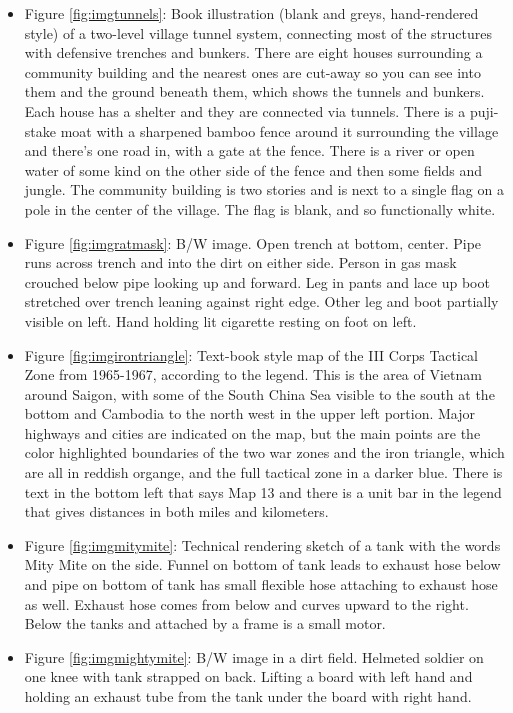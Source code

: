 \documentclass[
  11pt,
]{krantz}
\begin{document}
\begin{itemize}
\item
  Figure \ref{fig:imgtunnels}: Book illustration (blank and greys, hand-rendered style) of a two-level village tunnel system, connecting most of the structures with defensive trenches and bunkers. There are eight houses surrounding a community building and the nearest ones are cut-away so you can see into them and the ground beneath them, which shows the tunnels and bunkers. Each house has a shelter and they are connected via tunnels. There is a puji-stake moat with a sharpened bamboo fence around it surrounding the village and there's one road in, with a gate at the fence. There is a river or open water of some kind on the other side of the fence and then some fields and jungle. The community building is two stories and is next to a single flag on a pole in the center of the village. The flag is blank, and so functionally white.
\item
  Figure \ref{fig:imgratmask}: B/W image. Open trench at bottom, center. Pipe runs across trench and into the dirt on either side. Person in gas mask crouched below pipe looking up and forward. Leg in pants and lace up boot stretched over trench leaning against right edge. Other leg and boot partially visible on left. Hand holding lit cigarette resting on foot on left.
\item
  Figure \ref{fig:imgirontriangle}: Text-book style map of the III Corps Tactical Zone from 1965-1967, according to the legend. This is the area of Vietnam around Saigon, with some of the South China Sea visible to the south at the bottom and Cambodia to the north west in the upper left portion. Major highways and cities are indicated on the map, but the main points are the color highlighted boundaries of the two war zones and the iron triangle, which are all in reddish organge, and the full tactical zone in a darker blue. There is text in the bottom left that says Map 13 and there is a unit bar in the legend that gives distances in both miles and kilometers.
\item
  Figure \ref{fig:imgmitymite}: Technical rendering sketch of a tank with the words Mity Mite on the side. Funnel on bottom of tank leads to exhaust hose below and pipe on bottom of tank has small flexible hose attaching to exhaust hose as well. Exhaust hose comes from below and curves upward to the right. Below the tanks and attached by a frame is a small motor.
\item
  Figure \ref{fig:imgmightymite}: B/W image in a dirt field. Helmeted soldier on one knee with tank strapped on back. Lifting a board with left hand and holding an exhaust tube from the tank under the board with right hand.

\end{itemize}
\end{document}
